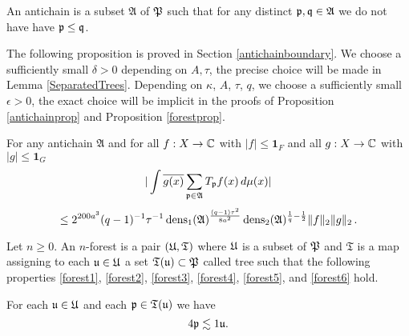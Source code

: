 An antichain is a subset $\mathfrak{A}$
of $\mathfrak P$ such that for any distinct $\mathfrak p,\mathfrak q\in \mathfrak{A}$ we do not have have $\mathfrak p\le \mathfrak q$.

The following proposition is proved in Section \ref{antichainboundary}.
We choose a sufficiently small $\delta > 0$ depending on $A, \tau$, the precise choice will be made in Lemma \ref{SeparatedTrees}.
Depending on $\kappa$, $A$, $\tau$, $q$, we choose a sufficiently small $\epsilon > 0$, the exact choice will be implicit in the proofs of Proposition \ref{antichainprop}  and Proposition \ref{forestprop}. 


\begin{prop}\label{antichainprop}
For any antichain $\mathfrak{A} $ and  for all $f:X\to \mathbb{C}$ with $|f|\le \mathbf{1}_F$ and all
$g:X\to \mathbb{C}$ with $|g|\le \mathbf{1}_{G}$
\begin{equation} \label{eq antiprop}
    |\int \overline{g(x)} \sum_{\mathfrak p \in \mathfrak{A}} T_{\mathfrak p} f(x)\, d\mu(x)|
    \end{equation}
    \begin{equation}
        \le  2^{200a^3}({q}-1)^{-1} \tau^{-1}\operatorname{\operatorname{dens}}_1(\mathfrak{A})^{\frac {(q-1)\tau^2}{8a^2}}\operatorname{\operatorname{dens}}_2(\mathfrak{A})^{\frac 1{q}-\frac 12}  \|f\|_2\|g\|_2\, .
    \end{equation}
\end{prop}

Let $n\ge 0$.
An $n$-forest is a pair $(\mathfrak U, \mathfrak{T})$
where  $\mathfrak U$ is a subset of $\mathfrak P$
and $\mathfrak{T}$ is a map assigning to
each $\mathfrak u\in \mathfrak U$ a set $\mathfrak T (\mathfrak u)\subset \mathfrak P$ called tree
such that the following properties
\eqref{forest1}, \eqref{forest2},
\eqref{forest3},
\eqref{forest4},
\eqref{forest5}, and
\eqref{forest6}
hold.

For each $\mathfrak u\in \mathfrak U$ and each $\mathfrak p\in \mathfrak T(\mathfrak u)$
we have
\begin{equation}\label{forest1}
4\mathfrak p\lesssim 1\mathfrak u.
\end{equation}

